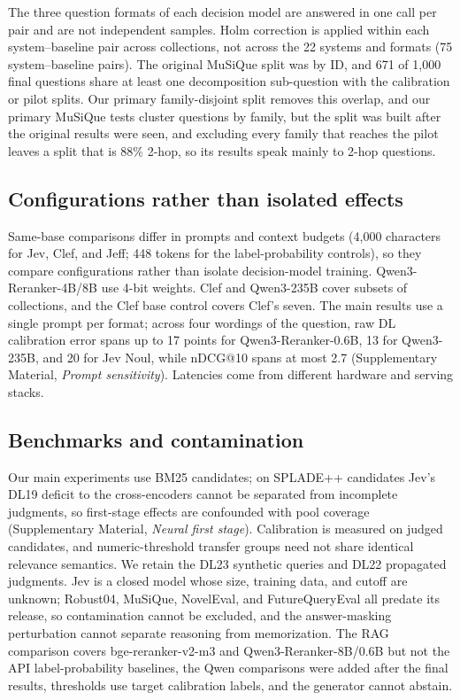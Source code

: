 The three question formats of each decision model are answered in one call per pair and are not independent samples. Holm correction is applied within each system--baseline pair across collections, not across the 22 systems and formats (75 system--baseline pairs). The original MuSiQue split was by ID, and 671 of 1{,}000 final questions share at least one decomposition sub-question with the calibration or pilot splits. Our primary family-disjoint split removes this overlap, and our primary MuSiQue tests cluster questions by family, but the split was built after the original results were seen, and excluding every family that reaches the pilot leaves a split that is 88\% 2-hop, so its results speak mainly to 2-hop questions.

\subsection{Configurations rather than isolated effects}

Same-base comparisons differ in prompts and context budgets (4{,}000 characters for Jev, Clef, and Jeff; 448 tokens for the label-probability controls), so they compare configurations rather than isolate decision-model training. Qwen3-Reranker-4B/8B use 4-bit weights. Clef and Qwen3-235B cover subsets of collections, and the Clef base control covers Clef's seven. The main results use a single prompt per format; across four wordings of the question, raw DL calibration error spans up to 17 points for Qwen3-Reranker-0.6B, 13 for Qwen3-235B, and 20 for Jev Noul, while nDCG@10 spans at most 2.7 (Supplementary Material, \emph{Prompt sensitivity}). Latencies come from different hardware and serving stacks.

\subsection{Benchmarks and contamination}

Our main experiments use BM25 candidates; on SPLADE++ candidates Jev's DL19 deficit to the cross-encoders cannot be separated from incomplete judgments, so first-stage effects are confounded with pool coverage (Supplementary Material, \emph{Neural first stage}). Calibration is measured on judged candidates, and numeric-threshold transfer groups need not share identical relevance semantics. We retain the DL23 synthetic queries and DL22 propagated judgments. Jev is a closed model whose size, training data, and cutoff are unknown; Robust04, MuSiQue, NovelEval, and FutureQueryEval all predate its release, so contamination cannot be excluded, and the answer-masking perturbation cannot separate reasoning from memorization. The RAG comparison covers bge-reranker-v2-m3 and Qwen3-Reranker-8B/0.6B but not the API label-probability baselines, the Qwen comparisons were added after the final results, thresholds use target calibration labels, and the generator cannot abstain.

